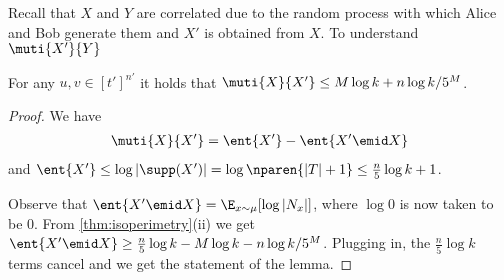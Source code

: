 Recall that $X$ and $Y$ are correlated due to the random process
with which Alice and Bob generate them and $X'$ is obtained from
$X$. To understand $\muti{X'}{Y}$
\begin{lemma}
\label{lem:x-uniform}
For any $u,v\in[t']^{n'}$ it holds that
$\muti{X}{X'}\le M\log k  + n\log k / 5^M$.
\end{lemma}
\begin{proof}
We have
\begin{align*}
\muti{X}{X'} = \ent{X'} - \ent{X'\emid X}
\end{align*}
and 
$\ent{X'}\le \log |\supp(X')|
    = \log \nparen{|T|+1}\le \frac{n}{5}\log k + 1$.

Observe that $\ent{X'\emid X} = \E_{x\sim
\mu}[\log|N_x|]$, where $\log 0$ is now taken to be $0$. From
\autoref{thm:isoperimetry}(ii) we get $\ent{X'\emid X}\geq
\frac{n}{5}\log k - M\log k - n\log k/5^M$.
Plugging in, the $\frac{n}{5}\log k$ terms cancel and we get
the statement of the lemma.
\end{proof}



